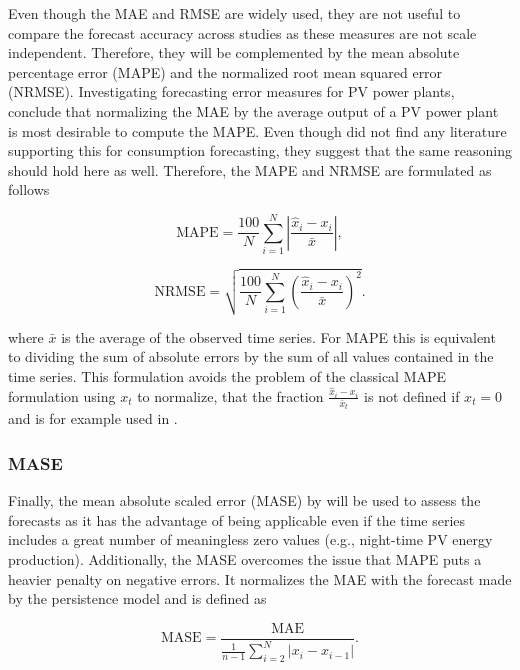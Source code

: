 Even though the MAE and RMSE are widely used, they are not useful to compare the forecast accuracy across studies as these measures are not scale independent. Therefore, they will be complemented by the mean absolute percentage error (MAPE) and the normalized root mean squared error (NRMSE). Investigating forecasting error measures for PV power plants, \citet{Hoff:2013} conclude that normalizing the MAE by the average output of a PV power plant is most desirable to compute the MAPE. Even though \citet{Meer:2018} did not find any literature supporting this for consumption forecasting, they suggest that the same reasoning should hold here as well. Therefore, the MAPE and NRMSE are formulated as follows

\begin{equation} \label{Eq:MAPE}
\text{MAPE}=\frac{100}{N}\sum_{i=1}^N\left|\frac{\widehat{x}_i-x_i}{\bar{x}}\right|,
\end{equation}

\begin{equation} \label{Eq:NRMSE}
\text{NRMSE}=\sqrt{\frac{100}{N}\sum_{i=1}^N\left(\frac{\widehat{x}_i-x_i}{\bar{x}}\right)^2}.
\end{equation}

where $\bar{x}$ is the average of the observed time series. For MAPE this is equivalent to dividing the sum of absolute errors by the sum of all values contained in the time series. This formulation avoids the problem of the classical MAPE formulation using $x_t$ to normalize, that the fraction $\frac{\widehat{x}_i-x_i}{\bar{x}_t}$ is not defined if $x_t=0$ and is for example used in \citet{Yamin:2004}.



\subsubsection{MASE}

Finally, the mean absolute scaled error (MASE) by \citet{Hyndman:2006} will be used to assess the forecasts as it has the advantage of being applicable even if the time series includes a great number of meaningless zero values (e.g., night-time PV energy production). Additionally, the MASE overcomes the issue that MAPE puts a heavier penalty on negative errors. It normalizes the MAE with the forecast made by the persistence model and is defined as

\begin{equation} \label{Eq:MASE}
\text{MASE}=\frac{\text{MAE}}{\frac{1}{n-1}\sum_{i=2}^N\left|x_i-x_{i-1}\right|}.
\end{equation}



